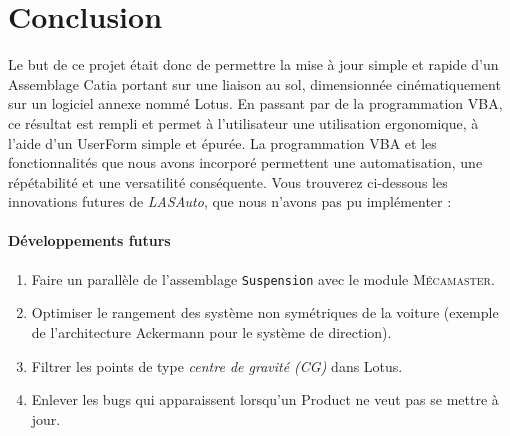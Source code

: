 \section{Conclusion}


Le but de ce projet était donc de permettre la mise à jour simple et rapide d'un Assemblage Catia portant sur une liaison au sol, dimensionnée cinématiquement sur un logiciel annexe nommé Lotus.
En passant par de la programmation VBA, ce résultat est rempli et permet à l'utilisateur une utilisation ergonomique, à l'aide d'un UserForm simple et épurée.
La programmation VBA et les fonctionnalités que nous avons incorporé permettent une automatisation, une répétabilité et une versatilité conséquente.
Vous trouverez ci-dessous les innovations futures de \textit{LASAuto}, que nous n'avons pas pu implémenter :

\paragraph{Développements futurs}
\begin{enumerate}
    \item Faire un parallèle de l'assemblage \texttt{Suspension} avec le module \textsc{Mécamaster}.
    \item Optimiser le rangement des système non symétriques de la voiture (exemple de l'architecture Ackermann pour le système de direction).
    \item Filtrer les points de type \textit{centre de gravité (CG)} dans Lotus.
    \item Enlever les bugs qui apparaissent lorsqu'un Product ne veut pas se mettre à jour.
\end{enumerate}



